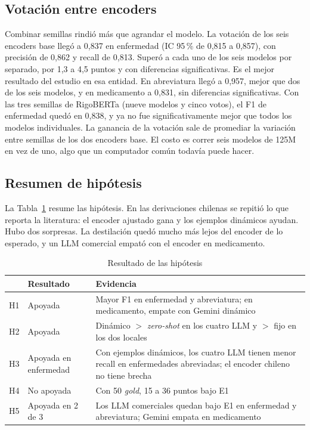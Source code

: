 \documentclass[10pt,journal,a4paper]{IEEEtran}
\begin{document}
\subsection{Votación entre encoders}

Combinar semillas rindió más que agrandar el modelo. La votación de los seis encoders base llegó a 0,837 en enfermedad (IC 95\,\% de 0,815 a 0,857), con precisión de 0,862 y recall de 0,813. Superó a cada uno de los seis modelos por separado, por 1,3 a 4,5 puntos y con diferencias significativas. Es el mejor resultado del estudio en esa entidad. En abreviatura llegó a 0,957, mejor que dos de los seis modelos, y en medicamento a 0,831, sin diferencias significativas. Con las tres semillas de RigoBERTa (nueve modelos y cinco votos), el F1 de enfermedad quedó en 0,838, y ya no fue significativamente mejor que todos los modelos individuales. La ganancia de la votación sale de promediar la variación entre semillas de los dos encoders base. El costo es correr seis modelos de 125M en vez de uno, algo que un computador común todavía puede hacer.

\subsection{Resumen de hipótesis}

La Tabla~\ref{tab:hipotesis} resume las hipótesis. En las derivaciones chilenas se repitió lo que reporta la literatura: el encoder ajustado gana y los ejemplos dinámicos ayudan. Hubo dos sorpresas. La destilación quedó mucho más lejos del encoder de lo esperado, y un LLM comercial empató con el encoder en medicamento.

\begin{table}[!t]
\centering
\caption{Resultado de las hip\'otesis}
\label{tab:hipotesis}
\begin{tabular}{p{0.6cm}p{2.0cm}p{4.9cm}}
\toprule
 & Resultado & Evidencia \\
\midrule
H1 & Apoyada & Mayor F1 en enfermedad y abreviatura; en medicamento, empate con Gemini dinámico \\
H2 & Apoyada & Dinámico $>$ \emph{zero-shot} en los cuatro LLM y $>$ fijo en los dos locales \\
H3 & Apoyada en enfermedad & Con ejemplos dinámicos, los cuatro LLM tienen menor recall en enfermedades abreviadas; el encoder chileno no tiene brecha \\
H4 & No apoyada & Con 50 \emph{gold}, 15 a 36 puntos bajo E1 \\
H5 & Apoyada en 2 de 3 & Los LLM comerciales quedan bajo E1 en enfermedad y abreviatura; Gemini empata en medicamento \\
\bottomrule
\end{tabular}
\end{table}
\end{document}
